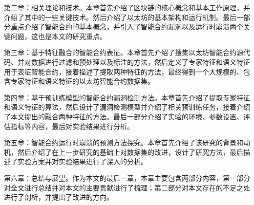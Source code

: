 第二章：相关理论和技术。本章首先介绍了区块链的核心概念和基本工作原理，并介绍了其中的一些关键技术。然后介绍了以太坊的基本架构和运行机制。最后一部分重点介绍了智能合约的基本概念，并引入了智能合约漏洞以及运行时崩溃两个关键问题，这也是本文的研究重点。

第三章：基于特征融合的智能合约表征。本章首先介绍了搜集以太坊智能合约源代码、并对数据进行过滤和预处理以及标注的方法，然后定义了专家特征和语义特征用于表征智能合约，接着描述了提取两种特征的方法，最终得到一个大规模的、包含专家特征和语义特征的以太坊智能合约数据集。

第四章：基于预训练模型的智能合约漏洞检测方法。本章首先介绍了提取专家特征和语义特征的算法，然后设计了漏洞检测模型并介绍了相关预训练任务，接着介绍了本文提出的融合两种特征的方法。最后一部分介绍了实验的环境、参数设置、评估指标等内容，最后对实验结果进行分析。

第五章：智能合约运行时崩溃的预测方法探究。本章首先介绍了该研究的背景和动机，然后介绍了在上一步研究的基础上对数据集的改进，设计了研究方法，最后描述了实验方案并对实验结果进行了深入的分析。

第六章：总结与展望。作为本文的最后一章，本章主要包含两部分内容，第一部分对全文进行总结并对本文的主要贡献进行了梳理；第二部分对本文存在的不足之处进行了剖析，并提出了改进的方向。

